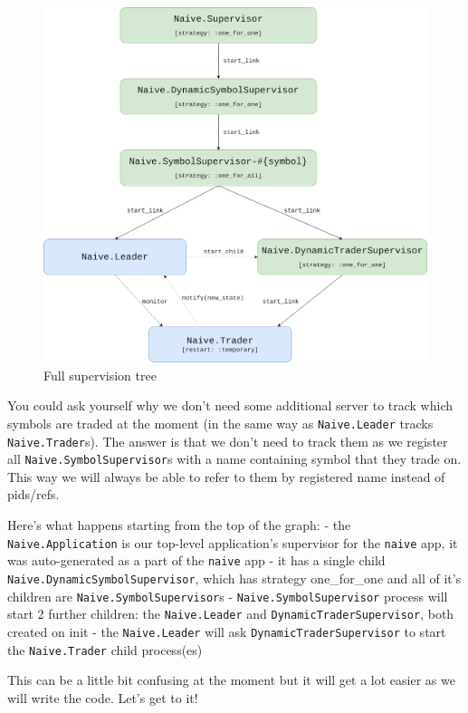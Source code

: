 \documentclass[
]{book}
\begin{document}
\begin{figure}
\centering
\includegraphics{images/chapter_05_05_full.png}
\caption{Full supervision tree}
\end{figure}

You could ask yourself why we don't need some additional server to track which symbols are traded at the moment (in the same way as \texttt{Naive.Leader} tracks \texttt{Naive.Trader}s). The answer is that we don't need to track them as we register all \texttt{Naive.SymbolSupervisor}s with a name containing symbol that they trade on. This way we will always be able to refer to them by registered name instead of pids/refs.

Here's what happens starting from the top of the graph:
- the \texttt{Naive.Application} is our top-level application's supervisor for the \texttt{naive} app, it was auto-generated as a part of the \texttt{naive} app
- it has a single child \texttt{Naive.DynamicSymbolSupervisor}, which has strategy one\_for\_one and all of it's children are \texttt{Naive.SymbolSupervisor}s
- \texttt{Naive.SymbolSupervisor} process will start 2 further children: the \texttt{Naive.Leader} and \texttt{DynamicTraderSupervisor}, both created on init
- the \texttt{Naive.Leader} will ask \texttt{DynamicTraderSupervisor} to start the \texttt{Naive.Trader} child process(es)

This can be a little bit confusing at the moment but it will get a lot easier
as we will write the code. Let's get to it!
\end{document}
